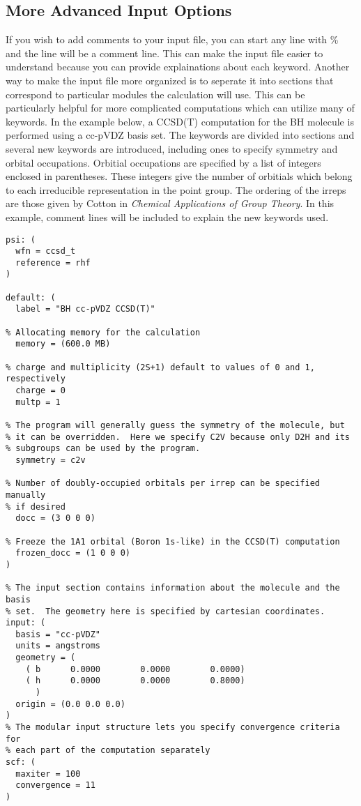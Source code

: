 \subsection{More Advanced Input Options}
If you wish to add comments to your input file, you can start any line
with \% and the line will be a comment line.  This can make the input
file easier to understand because you can provide explainations about
each keyword.  Another way to make the input file more organized is
to seperate it into sections that correspond to particular modules
the calculation will use.  This can be particularly helpful for more
complicated computations which can utilize many of keywords.  In the example
below, a CCSD(T) computation for the BH molecule is performed using a
cc-pVDZ basis set.  The keywords are divided into sections and several
new keywords are introduced, including ones to specify symmetry and
orbital occupations.  Orbitial occupations are specified by
a list of integers enclosed in parentheses.  These integers give the
number of orbitials which belong to each irreducible representation in
the point group.  The ordering of the irreps are those given by Cotton
in {\em Chemical Applications of Group Theory}.  In this example,
comment lines will be included to explain the new keywords used.

\begin{verbatim}
psi: (
  wfn = ccsd_t
  reference = rhf
)

default: (
  label = "BH cc-pVDZ CCSD(T)"

% Allocating memory for the calculation
  memory = (600.0 MB)

% charge and multiplicity (2S+1) default to values of 0 and 1, respectively
  charge = 0
  multp = 1

% The program will generally guess the symmetry of the molecule, but
% it can be overridden.  Here we specify C2V because only D2H and its
% subgroups can be used by the program.
  symmetry = c2v

% Number of doubly-occupied orbitals per irrep can be specified manually
% if desired
  docc = (3 0 0 0)

% Freeze the 1A1 orbital (Boron 1s-like) in the CCSD(T) computation
  frozen_docc = (1 0 0 0)
)

% The input section contains information about the molecule and the basis
% set.  The geometry here is specified by cartesian coordinates.
input: (
  basis = "cc-pVDZ"
  units = angstroms
  geometry = (
    ( b      0.0000        0.0000        0.0000)
    ( h      0.0000        0.0000        0.8000)
      )
  origin = (0.0 0.0 0.0)
)
% The modular input structure lets you specify convergence criteria for
% each part of the computation separately
scf: (
  maxiter = 100
  convergence = 11
)
\end{verbatim}

